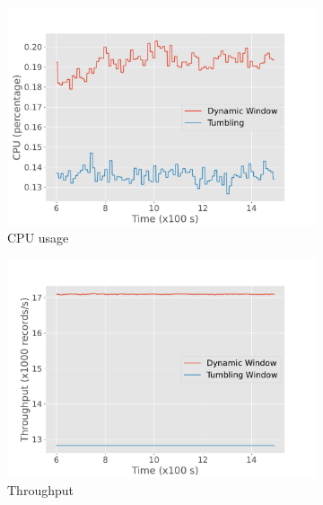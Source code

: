 \begin{figure}[htbp]
    \begin{subfigure}[b]{0.5\columnwidth}
        \includegraphics[width=\columnwidth]{fig/constant-rate/cpu_comparison.pdf}
        \caption{CPU usage}
        \label{fig:constant_cpu}
    \end{subfigure}
    \begin{subfigure}[b]{0.5\columnwidth}
        \includegraphics[width=\columnwidth]{fig/constant-rate/throughput_comparison.pdf}
        \caption{Throughput}
        \label{fig:constant_thorughput}
    \end{subfigure}
    \\
    \begin{subfigure}[b]{0.5\columnwidth}

\end{subfigure}
\end{figure}

